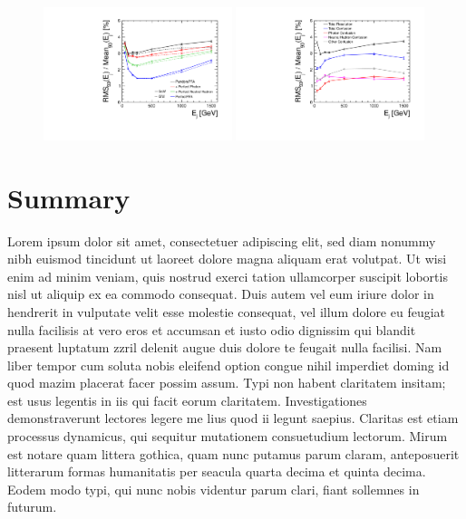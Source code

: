 \documentclass[final,3p,times,twocolumn]{elsarticle}
\begin{document}
\begin{figure}[!h]
  \begin{center}
     \includegraphics[width=0.49\textwidth]{HighEnergy_ResDiffAlgs.pdf}
     \includegraphics[width=0.49\textwidth]{HighEnergy_ScWConf.pdf}
     \caption{\label{}}
  \end{center}
\end{figure}

\section{Summary}
 Lorem ipsum dolor sit amet, consectetuer adipiscing elit, sed diam nonummy nibh euismod tincidunt ut laoreet dolore magna aliquam erat volutpat. Ut wisi enim ad minim veniam, quis
nostrud exerci tation ullamcorper suscipit lobortis nisl ut aliquip ex ea commodo consequat. Duis autem vel eum iriure dolor in hendrerit in vulputate velit esse molestie consequat,
vel illum dolore eu feugiat nulla facilisis at vero eros et accumsan et iusto odio dignissim qui blandit praesent luptatum zzril delenit augue duis dolore te feugait nulla facilisi.
Nam liber tempor cum soluta nobis eleifend option congue nihil imperdiet doming id quod mazim placerat facer possim assum. Typi non habent claritatem insitam; est usus legentis in
iis qui facit eorum claritatem. Investigationes demonstraverunt lectores legere me lius quod ii legunt saepius. Claritas est etiam processus dynamicus, qui sequitur mutationem
consuetudium lectorum. Mirum est notare quam littera gothica, quam nunc putamus parum claram, anteposuerit litterarum formas humanitatis per seacula quarta decima et quinta
decima. Eodem modo typi, qui nunc nobis videntur parum clari, fiant sollemnes in futurum.
\end{document}
